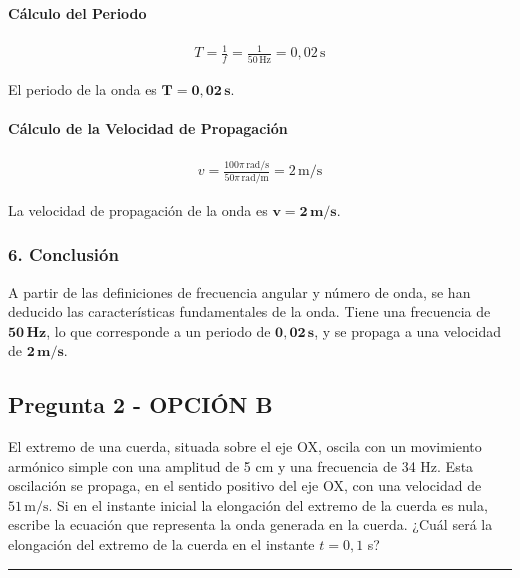 \paragraph*{Cálculo del Periodo}
\begin{gather}
    T = \frac{1}{f} = \frac{1}{50 \, \text{Hz}} = 0,02 \, \text{s}
\end{gather}
\begin{cajaresultado}
    El periodo de la onda es $\boldsymbol{T = 0,02 \, \textbf{s}}$.
\end{cajaresultado}

\paragraph*{Cálculo de la Velocidad de Propagación}
\begin{gather}
    v = \frac{100\pi \, \text{rad/s}}{50\pi \, \text{rad/m}} = 2 \, \text{m/s}
\end{gather}
\begin{cajaresultado}
    La velocidad de propagación de la onda es $\boldsymbol{v = 2 \, \textbf{m/s}}$.
\end{cajaresultado}

\subsubsection*{6. Conclusión}
\begin{cajaconclusion}
A partir de las definiciones de frecuencia angular y número de onda, se han deducido las características fundamentales de la onda. Tiene una frecuencia de $\mathbf{50 \, Hz}$, lo que corresponde a un periodo de $\mathbf{0,02 \, s}$, y se propaga a una velocidad de $\mathbf{2 \, m/s}$.
\end{cajaconclusion}

\newpage

\subsection{Pregunta 2 - OPCIÓN B}
\label{subsec:2B_2002_sep_ext}

\begin{cajaenunciado}
El extremo de una cuerda, situada sobre el eje OX, oscila con un movimiento armónico simple con una amplitud de 5 cm y una frecuencia de 34 Hz. Esta oscilación se propaga, en el sentido positivo del eje OX, con una velocidad de $51\,\text{m/s}$. Si en el instante inicial la elongación del extremo de la cuerda es nula, escribe la ecuación que representa la onda generada en la cuerda. ¿Cuál será la elongación del extremo de la cuerda en el instante $t=0,1$ s?
\end{cajaenunciado}
\hrule

